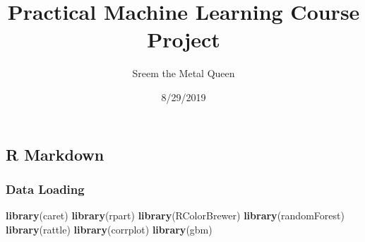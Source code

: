 \documentclass[]{article}
\title{Practical Machine Learning Course Project}
\author{Sreem the Metal Queen}
\date{8/29/2019}
\newenvironment{Shaded}{\begin{snugshade}}{\end{snugshade}}
\newcommand{\KeywordTok}[1]{\textcolor[rgb]{0.13,0.29,0.53}{\textbf{#1}}}
\newcommand{\NormalTok}[1]{#1}
\begin{document}
\maketitle

\hypertarget{r-markdown}{%
\subsection{R Markdown}\label{r-markdown}}

\hypertarget{data-loading}{%
\subsubsection{Data Loading}\label{data-loading}}

\begin{Shaded}
\begin{Highlighting}[]
\KeywordTok{library}\NormalTok{(caret)}
\KeywordTok{library}\NormalTok{(rpart)}
\KeywordTok{library}\NormalTok{(RColorBrewer)}
\KeywordTok{library}\NormalTok{(randomForest)}
\KeywordTok{library}\NormalTok{(rattle)}
\KeywordTok{library}\NormalTok{(corrplot)}
\KeywordTok{library}\NormalTok{(gbm)}
\end{Highlighting}
\end{Shaded}
\end{document}
